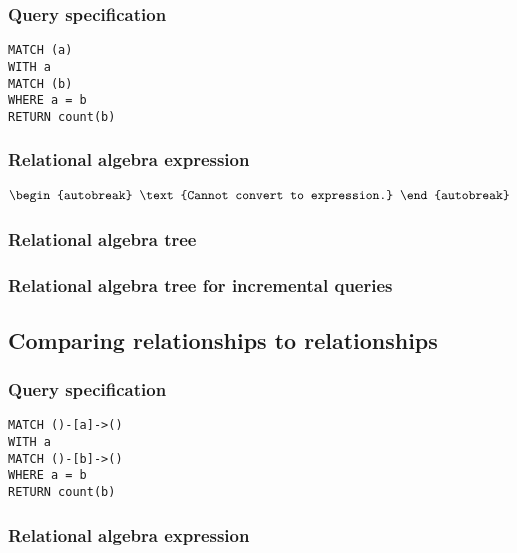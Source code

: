 \subsubsection*{Query specification}

\begin{lstlisting}
MATCH (a)
WITH a
MATCH (b)
WHERE a = b
RETURN count(b)
\end{lstlisting}

\subsubsection*{Relational algebra expression}

\begin{align*}
\begin{autobreak}
\text{Cannot convert to expression.}
\end{autobreak}
\end{align*}

\subsubsection*{Relational algebra tree}


\subsubsection*{Relational algebra tree for incremental queries}


\subsection{Comparing relationships to relationships}

\subsubsection*{Query specification}

\begin{lstlisting}
MATCH ()-[a]->()
WITH a
MATCH ()-[b]->()
WHERE a = b
RETURN count(b)
\end{lstlisting}

\subsubsection*{Relational algebra expression}


